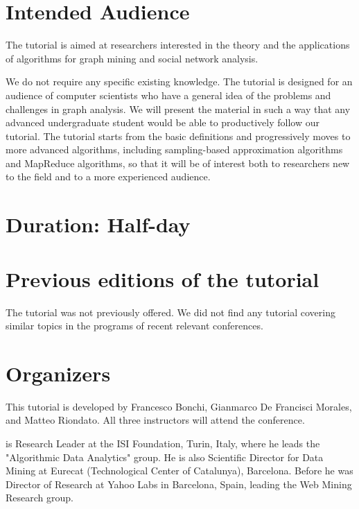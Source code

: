 \documentclass[11pt]{article}
\newcommand{\para}[1]{\noindent{\bf #1}}
\begin{document}
\section*{Intended Audience}
The tutorial is aimed at researchers interested in the theory and the
applications of algorithms for graph mining and social network analysis.

We do not require any specific existing knowledge. The tutorial is designed for
an audience of computer scientists who have a general idea of the problems and
challenges in graph analysis. We will present the material in such a way that
any advanced undergraduate student would be able to productively follow our
tutorial. %
The tutorial starts from the basic definitions and progressively moves to more advanced
algorithms, including sampling-based approximation algorithms and MapReduce
algorithms, so that it will be of interest both to researchers new
to the field and to a more experienced audience.

\section*{Duration: \textrm{Half-day}}

\section*{Previous editions of the tutorial}
The tutorial was not previously offered. We did not find any tutorial covering
similar topics in the programs of recent relevant conferences.

\vspace{-10pt}
\section*{Organizers}
This tutorial is developed by Francesco Bonchi, Gianmarco De Francisci Morales,
and Matteo Riondato. All three instructors will attend the conference.

\para{Francesco Bonchi} is Research Leader at the ISI Foundation, Turin, Italy,
where he leads the "Algorithmic Data Analytics" group. He is also Scientific
Director for Data Mining at Eurecat (Technological Center of Catalunya),
Barcelona. Before he was Director of Research at Yahoo Labs in Barcelona, Spain,
leading the Web Mining Research group.
\end{document}
